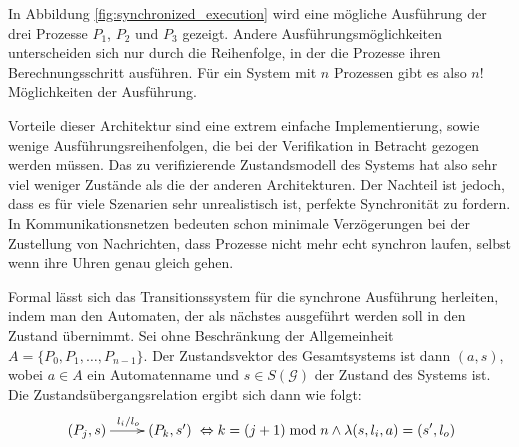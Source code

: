 In Abbildung \ref{fig:synchronized_execution} wird eine mögliche Ausführung der drei Prozesse $P_1$, $P_2$ und $P_3$ gezeigt.
Andere Ausführungsmöglichkeiten unterscheiden sich nur durch die Reihenfolge, in der die Prozesse ihren Berechnungsschritt ausführen.
Für ein System mit $n$ Prozessen gibt es also $n!$ Möglichkeiten der Ausführung.

Vorteile dieser Architektur sind eine extrem einfache Implementierung, sowie wenige Ausführungsreihenfolgen, die bei der Verifikation in Betracht gezogen werden müssen.
Das zu verifizierende Zustandsmodell des Systems hat also sehr viel weniger Zustände als die der anderen Architekturen.
Der Nachteil ist jedoch, dass es für viele Szenarien sehr unrealistisch ist, perfekte Synchronität zu fordern.
In Kommunikationsnetzen bedeuten schon minimale Verzögerungen bei der Zustellung von Nachrichten, dass Prozesse nicht mehr echt synchron laufen, selbst wenn ihre Uhren genau gleich gehen.

Formal lässt sich das Transitionssystem für die synchrone Ausführung herleiten, indem man den Automaten, der als nächstes ausgeführt werden soll in den Zustand übernimmt.
Sei ohne Beschränkung der Allgemeinheit $A=\{P_0,P_1,\dots,P_{n-1}\}$.
Der Zustandsvektor des Gesamtsystems ist dann $(a,s)$, wobei $a\in A$ ein Automatenname und $s\in S(\mathcal{G})$ der Zustand des Systems ist.
Die Zustandsübergangsrelation ergibt sich dann wie folgt:
\[ \xymatrix { (P_j,s) \ar[r]^{l_i/l_o} & (P_k,s') } \Leftrightarrow k=(j+1)\bmod n\land \lambda(s,l_i,a) = (s',l_o) \]

